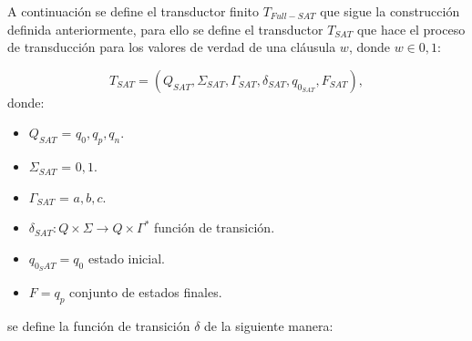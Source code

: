 \documentclass{article}
\begin{document}
A continuación se define el transductor finito $T_{Full-SAT}$ que sigue la construcción definida anteriormente, para ello se define
el transductor $T_{SAT}$ que hace el proceso de transducción para los valores de verdad de una cláusula $w$, donde $w\in {0,1}$:

\[
    T_{SAT} = (Q_{SAT}, {\Sigma}_{SAT}, \Gamma_{SAT}, \delta_{SAT}, q_{0_{SAT}}, F_{SAT}),
\]
donde:
\begin{itemize}
    \item \(Q_{SAT}\) = ${q_0,q_p,q_n}$.
    \item \(\Sigma_{SAT}\) = ${0,1}$.
    \item \(\Gamma_{SAT}\) = ${a,b,c}$.
    \item \(\delta_{SAT}: Q \times \Sigma \to Q \times \Gamma^*\) función de transición.
    \item \(q_{0_SAT} = q_0\) estado inicial.
    \item \(F={q_p}\) conjunto de estados finales.
\end{itemize}
se define la función de transición $\delta$ de la siguiente manera:
\end{document}

